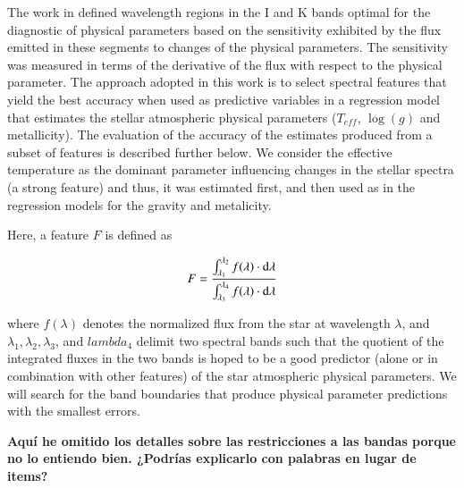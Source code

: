 {{The work in \cite{2013A&A...549A.129C} defined wavelength regions in
the I and K bands optimal for the diagnostic of physical parameters
based on the sensitivity exhibited by the flux emitted in these
segments to changes of the physical parameters. The sensitivity was
measured in terms of the derivative of the flux with respect to the
physical parameter. The approach adopted in this work is to select
spectral features that yield the best accuracy when used as predictive
variables in a regression model that estimates the stellar atmospheric
physical parameters ($T_{eff}$, $\log(g)$ and metallicity). The
evaluation of the accuracy of the estimates produced from a subset of
features is described further below. We consider the effective
temperature as the dominant parameter influencing changes in the
stellar spectra (a strong feature) and thus, it was estimated first,
and then used as in the regression models for the gravity and
metalicity.}

Here, a feature $F$ is defined as

\begin{equation}\label{eq:feature}
  F = \frac{ \int_{\lambda_{1}}^{\lambda_{2}}f(\lambda) \cdot {\rm d}{\lambda}}
               {\int_{\lambda_{3}}^{\lambda_{4}} f(\lambda) \cdot {\rm d}{\lambda}} 
\end{equation}

where $f(\lambda)$ denotes the normalized flux from the star at
wavelength $\lambda$, and $\lambda_1, \lambda_2, \lambda_3$, and
$lambda_4$ delimit two spectral bands such that the quotient of the
integrated fluxes in the two bands is hoped to be a good predictor
(alone or in combination with other features) of the star atmospheric
physical parameters. We will search for the band boundaries that
produce physical parameter predictions with the smallest errors.

{\bf Aquí he omitido los detalles sobre las restricciones a las bandas
porque no lo entiendo bien. ¿Podrías explicarlo con palabras en lugar
de items?}


}
